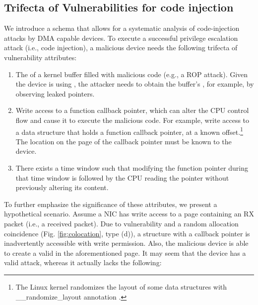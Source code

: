 

\subsection{Trifecta of Vulnerabilities for code injection}\label{sec:mmo}

We introduce a schema that allows for a systematic analysis of code-injection attacks by DMA capable devices.
To execute a successful privilege escalation attack (i.e., code injection), a malicious device needs the following trifecta of vulnerability attributes:
\begin{enumerate}
    \item The \kva{} of a kernel buffer filled with malicious code (e.g., a ROP attack). Given the device is using \iova, the attacker needs to obtain the buffer's \kva{}, for example, by observing leaked pointers. 
    \item Write access to a function callback pointer, which can alter the CPU control flow and cause it to execute the malicious code. For example, write access to a data structure that holds a function callback pointer, at a known offset.\footnote{The Linux kernel randomizes the layout of some data structures with \_\_randomize\_layout annotation \cite{rand_layout}.} The location on the page of the callback pointer must be known to the device.
    \item There exists a time window such that modifying the function pointer during that time window is followed by the CPU reading the pointer without previously altering its content.
\end{enumerate}

To further emphasize the significance of these attributes, we present a hypothetical scenario. Assume a NIC has write access to a page containing an RX packet (i.e., a received packet). Due to \subpage{} vulnerability and a random allocation coincidence (Fig. \ref{fig:colocation}, type (d)), a structure with a callback pointer is inadvertently accessible with write permission. Also, the malicious device is able to create a valid \mabaf{} in the aforementioned page. It may seem that the device has a valid attack, whereas it actually lacks the following:

